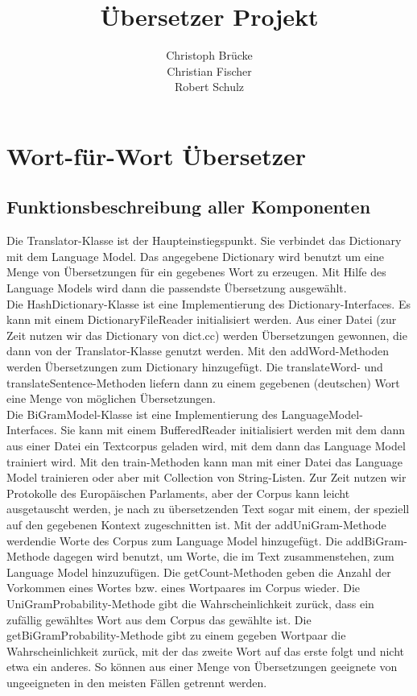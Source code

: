 \documentclass[12pt]{amsart}
\title{Übersetzer Projekt}
\author{Christoph Brücke \\
	Christian Fischer\\
	Robert Schulz}
\date{} %
\begin{document}
\maketitle
\tableofcontents

\section{Wort-für-Wort Übersetzer}
\subsection{Funktionsbeschreibung aller Komponenten}
Die Translator-Klasse ist der Haupteinstiegspunkt. Sie verbindet das Dictionary mit dem Language Model. Das angegebene Dictionary wird benutzt um eine Menge von Übersetzungen für ein gegebenes Wort zu erzeugen. Mit Hilfe des Language Models wird dann die passendste Übersetzung ausgewählt.\\
Die HashDictionary-Klasse ist eine Implementierung des Dictionary-Interfaces. Es kann mit einem DictionaryFileReader initialisiert werden. Aus einer Datei (zur Zeit nutzen wir das Dictionary von dict.cc) werden Übersetzungen gewonnen, die dann von der Translator-Klasse genutzt werden. Mit den addWord-Methoden werden Übersetzungen zum Dictionary hinzugefügt. Die translateWord- und translateSentence-Methoden liefern dann zu einem gegebenen (deutschen) Wort eine Menge von möglichen Übersetzungen.\\
Die BiGramModel-Klasse ist eine Implementierung des LanguageModel-Interfaces. Sie kann mit einem BufferedReader initialisiert werden mit dem dann aus einer Datei ein Textcorpus geladen wird, mit dem dann das Language Model trainiert wird. Mit den train-Methoden kann man mit einer Datei das Language Model trainieren oder aber mit Collection von String-Listen. Zur Zeit nutzen wir Protokolle des Europäischen Parlaments, aber der Corpus kann leicht ausgetauscht werden, je nach zu übersetzenden Text sogar mit einem, der speziell auf den gegebenen Kontext zugeschnitten ist. Mit der addUniGram-Methode werdendie Worte des Corpus zum Language Model hinzugefügt. Die addBiGram-Methode dagegen wird benutzt, um Worte, die im Text zusammenstehen, zum Language Model hinzuzufügen. Die getCount-Methoden geben die Anzahl der Vorkommen eines Wortes bzw. eines Wortpaares im Corpus wieder. Die UniGramProbability-Methode gibt die Wahrscheinlichkeit zurück, dass ein zufällig gewähltes Wort aus dem Corpus das gewählte ist. Die getBiGramProbability-Methode gibt zu einem gegeben Wortpaar die Wahrscheinlichkeit zurück, mit der das zweite Wort auf das erste folgt und nicht etwa ein anderes. So können aus einer Menge von Übersetzungen geeignete von ungeeigneten in den meisten Fällen getrennt werden.\\
\end{document}
